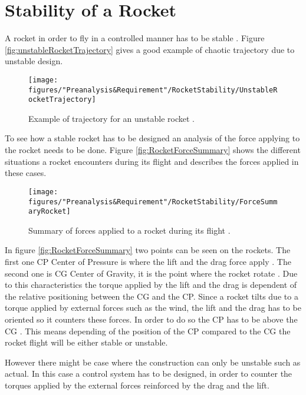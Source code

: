 \section{Stability of a Rocket}

A rocket in order to fly in a controlled manner has to be stable \cite{web:rocketnasa}. Figure \vref{fig:unstableRocketTrajectory} gives a good example of chaotic trajectory due to unstable design.

\begin{figure} [htbp]
	\centering
	\texttt{[image: figures/"Preanalysis\&Requirement"/RocketStability/UnstableRocketTrajectory]}
	\caption{Example of trajectory for an unstable rocket \cite{web:rocketnasa}.}
	\label{fig:unstableRocketTrajectory}
\end{figure}

To see how a stable rocket has to be designed an analysis of the force applying to the rocket needs to be done. Figure \vref{fig:RocketForceSummary} shows the different situations a rocket encounters during its flight and describes the forces applied in these cases.

\begin{figure}[htbp]
	\centering
	\texttt{[image: figures/"Preanalysis\&Requirement"/RocketStability/ForceSummaryRocket]}
	\caption{Summary of forces applied to a rocket during its flight \cite{web:rocketnasa}.}
	\label{fig:RocketForceSummary}
\end{figure}

In figure \vref{fig:RocketForceSummary} two points can be seen on the rockets. The first one CP Center of Pressure is where the  lift and the drag force apply \cite{web:rocketnasa}. The second one is CG Center of Gravity, it is the point where the rocket rotate \cite{web:rocketnasa}. Due to this characteristics the torque applied by the lift and the drag is dependent of the relative positioning between the CG and the CP. Since a rocket tilts due to a torque applied by external forces such as the wind, the lift and the drag has to be oriented so it counters these forces. In order to do so the CP has to be above the CG \cite{web:rocketnasa}.
This means depending of the position of the CP compared to the CG the rocket flight will be either stable or unstable.

However there might be case where the construction can only be unstable such as actual. In this case a control system has to be designed, in order to counter the torques applied by the external forces reinforced by the drag and the lift.